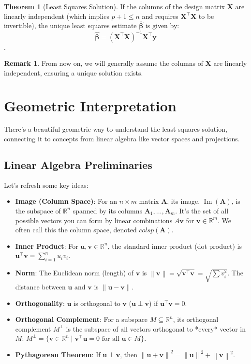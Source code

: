 \documentclass[11pt, letterpaper]{article}
\theoremstyle{definition}
\newtheorem{theorem}{Theorem}[section]
\newtheorem{remark}{Remark}[section]
\newcommand{\R}{\mathbb{R}}
\newcommand{\norm}[1]{\left\lVert#1\right\rVert}
\newcommand{\mat}[1]{\mathbf{#1}} %
\newcommand{\vect}[1]{\mathbf{#1}} %
\DeclareMathOperator{\im}{Im}       %
\begin{document}
\begin{theorem}[Least Squares Solution]
If the columns of the design matrix $\mat{X}$ are linearly independent (which implies $p+1 \le n$ and requires $\mat{X}^{\top}\mat{X}$ to be invertible), the unique least squares estimate $\hat{\vect{\beta}}$ is given by:
\[
\hat{\vect{\beta}} = (\mat{X}^{\top}\mat{X})^{-1} \mat{X}^{\top}\vect{y}
\].
\end{theorem}

\begin{remark}
From now on, we will generally assume the columns of $\mat{X}$ are linearly independent, ensuring a unique solution exists.
\end{remark}

\section{Geometric Interpretation}

There's a beautiful geometric way to understand the least squares solution, connecting it to concepts from linear algebra like vector spaces and projections.

\subsection{Linear Algebra Preliminaries}

Let's refresh some key ideas:
\begin{itemize}
    \item \textbf{Image (Column Space)}: For an $n \times m$ matrix $\mat{A}$, its image, $\im(\mat{A})$, is the subspace of $\R^n$ spanned by its columns $\vect{A}_1, \dots, \vect{A}_m$. It's the set of all possible vectors you can form by linear combinations $A\vect{v}$ for $\vect{v} \in \R^m$. We often call this the column space, denoted $colsp(\mat{A})$.
    \item \textbf{Inner Product}: For $\vect{u}, \vect{v} \in \R^n$, the standard inner product (dot product) is $\vect{u}^{\top}\vect{v} = \sum_{i=1}^n u_i v_i$.
    \item \textbf{Norm}: The Euclidean norm (length) of $\vect{v}$ is $\norm{\vect{v}} = \sqrt{\vect{v}^{\top}\vect{v}} = \sqrt{\sum v_i^2}$. The distance between $\vect{u}$ and $\vect{v}$ is $\norm{\vect{u}-\vect{v}}$.
    \item \textbf{Orthogonality}: $\vect{u}$ is orthogonal to $\vect{v}$ ($\vect{u} \perp \vect{v}$) if $\vect{u}^{\top}\vect{v} = 0$.
    \item \textbf{Orthogonal Complement}: For a subspace $M \subseteq \R^n$, its orthogonal complement $M^{\perp}$ is the subspace of all vectors orthogonal to *every* vector in $M$: $M^{\perp} = \{ \vect{v} \in \R^n \mid \vect{v}^{\top}\vect{u} = 0 \text{ for all } \vect{u} \in M \}$.
    \item \textbf{Pythagorean Theorem}: If $\vect{u} \perp \vect{v}$, then $\norm{\vect{u}+\vect{v}}^2 = \norm{\vect{u}}^2 + \norm{\vect{v}}^2$.
\end{itemize}
\end{document}
